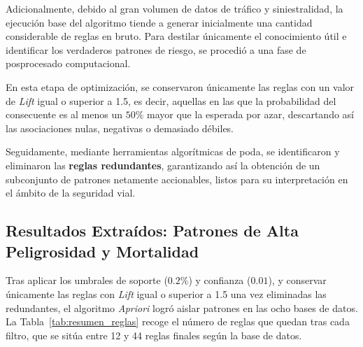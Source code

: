 \documentclass[twoside,a4paper,12pt,onecolumn,openany]{book}
\begin{document}
Adicionalmente, debido al gran volumen de datos de tráfico y siniestralidad, la ejecución base del algoritmo tiende a generar inicialmente una cantidad considerable de reglas en bruto. Para destilar únicamente el conocimiento útil e identificar los verdaderos patrones de riesgo, se procedió a una fase de posprocesado computacional. 

\vspace{0.5cm}

En esta etapa de optimización, se conservaron únicamente las reglas con un valor de \textit{Lift} igual o superior a 1.5, es decir, aquellas en las que la probabilidad del consecuente es al menos un $50\%$ mayor que la esperada por azar, descartando así las asociaciones nulas, negativas o demasiado débiles. 

\vspace{0.5cm}

Seguidamente, mediante herramientas algorítmicas de poda, se identificaron y eliminaron las \textbf{reglas redundantes}, garantizando así la obtención de un subconjunto de patrones netamente accionables, listos para su interpretación en el ámbito de la seguridad vial.


\subsection{Resultados Extraídos: Patrones de Alta Peligrosidad y Mortalidad}

Tras aplicar los umbrales de soporte ($0.2\%$) y confianza ($0.01$), y conservar únicamente las reglas con \textit{Lift} igual o superior a 1.5 una vez eliminadas las redundantes, el algoritmo \textit{Apriori} logró aislar patrones en las ocho bases de datos. La Tabla~\ref{tab:resumen_reglas} recoge el número de reglas que quedan tras cada filtro, que se sitúa entre 12 y 44 reglas finales según la base de datos.
\end{document}
